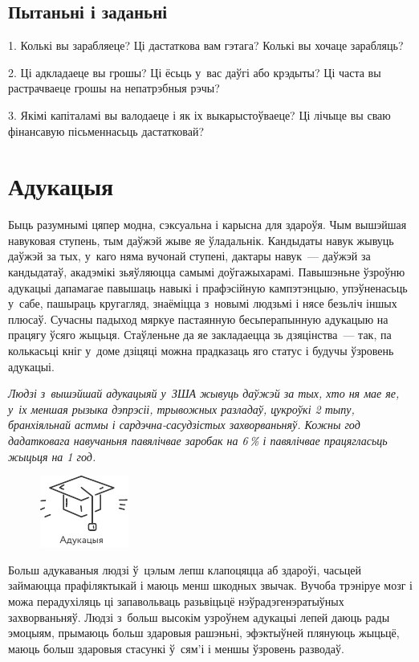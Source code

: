 \subsection*{Пытаньні і заданьні}

1. Колькі вы зарабляеце? Ці дастаткова вам гэтага? Колькі вы хочаце зарабляць?

2. Ці адкладаеце вы грошы? Ці ёсьць у~вас даўгі або крэдыты? Ці часта вы растрачваеце грошы на непатрэбныя рэчы?

3. Якімі капіталамі вы валодаеце і як іх выкарыстоўваеце? Ці лічыце вы сваю фінансавую пісьменнасьць дастатковай?


\section{Адукацыя}

Быць разумнымі цяпер модна, сэксуальна і карысна для здароўя. Чым вышэйшая навуковая ступень, тым даўжэй жыве яе ўладальнік. Кандыдаты навук жывуць даўжэй за тых, у~каго няма вучонай ступені, дактары навук~--- даўжэй за кандыдатаў, акадэмікі зьяўляюцца самымі доўгажыхарамі. Павышэньне ўзроўню адукацыі дапамагае павышаць навыкі і прафэсійную кампэтэнцыю, упэўненасьць у~сабе, пашыраць кругагляд, знаёміцца з~новымі людзьмі і нясе безьліч іншых плюсаў. Сучасны падыход мяркуе пастаянную бесьперапынную адукацыю на працягу ўсяго жыцьця. Стаўленьне да яе закладаецца зь дзяцінства~--- так, па колькасьці кніг у~доме дзіцяці можна прадказаць яго статус і будучы ўзровень адукацыі.

\emph{Людзі з~вышэйшай адукацыяй у~ЗША жывуць даўжэй за тых, хто ня мае яе, у~іх меншая рызыка дэпрэсіі, трывожных разладаў, цукроўкі 2 тыпу, бранхіяльнай астмы і сардэчна-сасудзістых захворваньняў. Кожны год дадатковага навучаньня павялічвае заробак на 6\,\% і павялічвае працягласьць жыцьця на 1 год.}

\begin{figure}[htb!]
  \centering
  \includegraphics[scale=1.5]{willpower/ch9/4.pdf}
\end{figure}

Больш адукаваныя людзі ў~цэлым лепш клапоцяцца аб здароўі, часьцей займаюцца прафіляктыкай і маюць менш шкодных звычак. Вучоба трэніруе мозг і можа перадухіляць ці запавольваць разьвіцьцё нэўрадэгенэратыўных захворваньняў. Людзі з~больш высокім узроўнем адукацыі лепей даюць рады эмоцыям, прымаюць больш здаровыя рашэньні, эфэктыўней плянуюць жыцьцё, маюць больш здаровыя стасункі ў~сям'і і меншы ўзровень разводаў.

